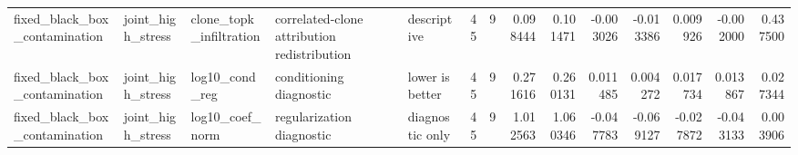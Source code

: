 \begin{table}[t]
\begin{tabular}{lllllrrrrrrrrr}
fixed_black_box_contamination & joint_high_stress & clone_topk_infiltration & correlated-clone attribution redistribution & descriptive & 45 & 9 & 0.098444 & 0.101471 & -0.003026 & -0.013386 & 0.009926 & -0.002000 & 0.437500 \\
fixed_black_box_contamination & joint_high_stress & log10_cond_reg & conditioning diagnostic & lower is better & 45 & 9 & 0.271616 & 0.260131 & 0.011485 & 0.004272 & 0.017734 & 0.013867 & 0.027344 \\
fixed_black_box_contamination & joint_high_stress & log10_coef_norm & regularization diagnostic & diagnostic only & 45 & 9 & 1.012563 & 1.060346 & -0.047783 & -0.069127 & -0.027872 & -0.043133 & 0.003906 \\
\bottomrule
\end{tabular}
\end{table}
